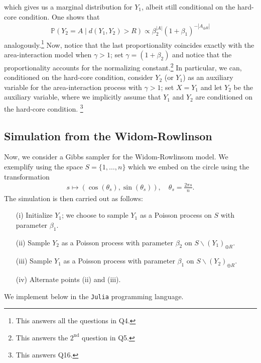 \documentclass{article}
\begin{document}
which gives us a marginal distribution for $Y_1$, albeit still conditional on the hard-core condition. One shows that
\begin{align*}
    \mathbb{P}(Y_2 = A \mid d(Y_1,Y_2)>R) \propto\beta_2^{|A|} (1+\beta_1)^{-|A_{\oplus R}|}
\end{align*}
analogously.\footnote{This answers all the questions in Q4.}
Now, notice that the last proportionality coincides exactly with the area-interaction model when $\gamma > 1$; set $\gamma = (1 + \beta_2)$ and notice that the proportionality accounts for the normalizing constant.\footnote{This answers the $2^{\mathrm{nd}}$ question in Q5.}\newline\newline
In particular, we can, conditioned on the hard-core condition, consider $Y_2$ (or $Y_1$) as an auxiliary variable for the area-interaction process with $\gamma > 1$; set $X = Y_1$ and let $Y_2$ be the auxiliary variable, where we implicitly assume that $Y_1$ and $Y_2$ are conditioned on the hard-core condition. \footnote{This answers Q16.}
\subsection{Simulation from the Widom-Rowlinson}
Now, we consider a Gibbs sampler for the Widom-Rowlinsom model. We exemplify using the space $S = \{1,\dots, n\}$ which we embed on the circle using the transformation 
\begin{align*}
    s \mapsto (\cos(\theta_s), \sin(\theta_s)), \quad \theta_s = \frac{2\pi s}{n}.
\end{align*}
The simulation is then carried out as follows: 
\begin{itemize}
    \item[(i)] Initialize $Y_1$; we choose to sample $Y_1$ as a Poisson process on $S$ with parameter $\beta_1$.
    \item[(ii)] Sample $Y_2$ as a Poisson process with parameter $\beta_2$ on $S\backslash (Y_{1})_{\oplus R}$. 
    \item[(iii)] Sample $Y_1$ as a Poisson process with parameter $\beta_1$ on $S\backslash (Y_{2})_{\oplus R}$.
    \item[(iv)] Alternate points (ii) and (iii).  
\end{itemize}
We implement below in the \texttt{Julia} programming language.
%
\end{document}
